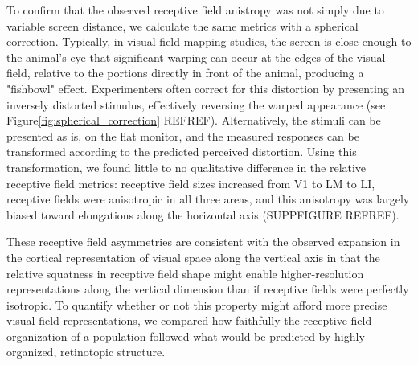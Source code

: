 To confirm that the observed receptive field anistropy was not simply due to variable screen distance, we calculate the same metrics with a spherical correction. Typically, in visual field mapping studies, the screen is close enough to the animal's eye that significant warping can occur at the edges of the visual field, relative to the portions directly in front of the animal, producing a "fishbowl" effect. Experimenters often correct for this distortion by presenting an inversely distorted stimulus, effectively reversing the warped appearance (see Figure\ref{fig:spherical_correction} REFREF). Alternatively, the stimuli can be presented as is, on the flat monitor, and the measured responses can be transformed according to the predicted perceived distortion. Using this transformation, we found little to no qualitative difference in the relative receptive field metrics: receptive field sizes increased from V1 to LM to LI, receptive fields were anisotropic in all three areas, and this anisotropy was largely biased toward elongations along the horizontal axis (SUPPFIGURE REFREF).

These receptive field asymmetries are consistent with the observed expansion in the cortical representation of visual space along the vertical axis in that the relative squatness in receptive field shape might enable higher-resolution representations along the vertical dimension than if receptive fields were perfectly isotropic. To quantify whether or not this property might afford more precise visual field representations, we compared how faithfully the receptive field organization of a population followed what would be predicted by highly-organized, retinotopic structure. 

